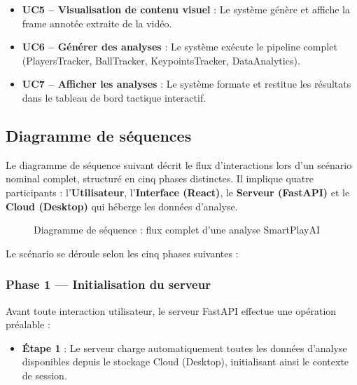 \begin{itemize}[leftmargin=1.5em]
  \item \textbf{UC5 – Visualisation de contenu visuel} : Le système génère et affiche la frame
        annotée extraite de la vidéo.
 
  \item \textbf{UC6 – Générer des analyses} : Le système exécute le pipeline complet
        (PlayersTracker, BallTracker, KeypointsTracker, DataAnalytics).
 
  \item \textbf{UC7 – Afficher les analyses} : Le système formate et restitue les résultats
        dans le tableau de bord tactique interactif.
\end{itemize}
 
\subsection{Diagramme de séquences}
 
Le diagramme de séquence suivant décrit le flux d'interactions lors d'un scénario nominal
complet, structuré en cinq phases distinctes. Il implique quatre participants :
l'\textbf{Utilisateur}, l'\textbf{Interface (React)}, le \textbf{Serveur (FastAPI)} et le
\textbf{Cloud (Desktop)} qui héberge les données d'analyse.
 
\begin{figure}[H]
    \centering
    \caption{Diagramme de séquence : flux complet d'une analyse SmartPlayAI}
    \label{fig:sequence}
\end{figure}

Le scénario se déroule selon les cinq phases suivantes :
 
\subsubsection*{Phase 1 — Initialisation du serveur}
Avant toute interaction utilisateur, le serveur FastAPI effectue une opération préalable :
\begin{itemize}[leftmargin=1.5em]
  \item \textbf{Étape 1} : Le serveur charge automatiquement toutes les données d'analyse
        disponibles depuis le stockage Cloud (Desktop), initialisant ainsi le contexte de
        session.
\end{itemize}
 
